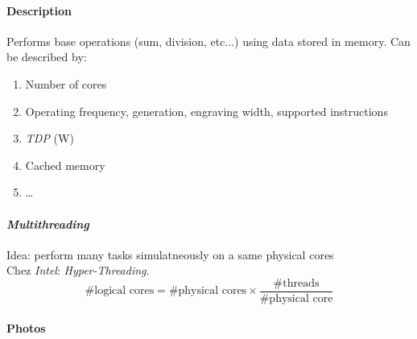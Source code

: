 \documentclass[11pt]{article}
\begin{document}
				\paragraph{Description}
					Performs base operations (sum, division, etc...) using data stored in memory. Can be described by:
					\begin{enumerate}
							\item Number of cores
							\item Operating frequency, generation, engraving width, supported instructions
							\item \textit{TDP} (W)
							\item Cached memory
							\item \ldots
					\end{enumerate}

				\paragraph{\textit{Multithreading}}
					Idea: perform many tasks simulatneously on a same physical cores \\
					Chez \textit{Intel}: \textit{Hyper-Threading}.
					\begin{equation*}
							\text{\#logical cores} = \text{\#physical cores} \times \frac{\text{\#threads}}{\text{\#physical core}}
					\end{equation*}

				\paragraph{Photos}
					\hspace{1pt}
					\\
\end{document}
